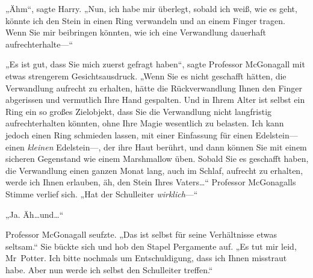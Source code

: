 „Ähm“, sagte Harry. „Nun, ich habe mir überlegt, sobald ich weiß, wie es geht, könnte ich den Stein in einen Ring verwandeln und an einem Finger tragen. Wenn Sie mir beibringen könnten, wie ich eine Verwandlung dauerhaft aufrechterhalte—“

„Es ist gut, dass Sie mich zuerst gefragt haben“, sagte Professor McGonagall mit etwas strengerem Gesichtsausdruck. „Wenn Sie es nicht geschafft hätten, die Verwandlung aufrecht zu erhalten, hätte die Rückverwandlung Ihnen den Finger abgerissen und vermutlich Ihre Hand gespalten. Und in Ihrem Alter ist selbst ein Ring ein so großes Zielobjekt, dass Sie die Verwandlung nicht langfristig aufrechterhalten könnten, ohne Ihre Magie wesentlich zu belasten. Ich kann jedoch einen Ring schmieden lassen, mit einer Einfassung für einen Edelstein—einen \emph{kleinen} Edelstein—, der ihre Haut berührt, und dann können Sie mit einem sicheren Gegenstand wie einem Marshmallow üben. Sobald Sie es geschafft haben, die Verwandlung einen ganzen Monat lang, auch im Schlaf, aufrecht zu erhalten, werde ich Ihnen erlauben, äh, den Stein Ihres Vaters…“ Professor McGonagalls Stimme verlief sich. „Hat der Schulleiter \emph{wirklich}—“

„Ja. Äh…und…“

Professor McGonagall seufzte. „Das ist selbst für seine Verhältnisse etwas seltsam.“ Sie bückte sich und hob den Stapel Pergamente auf. „Es tut mir leid, Mr~Potter. Ich bitte nochmals um Entschuldigung, dass ich Ihnen misstraut habe. Aber nun werde ich selbst den Schulleiter treffen.“


